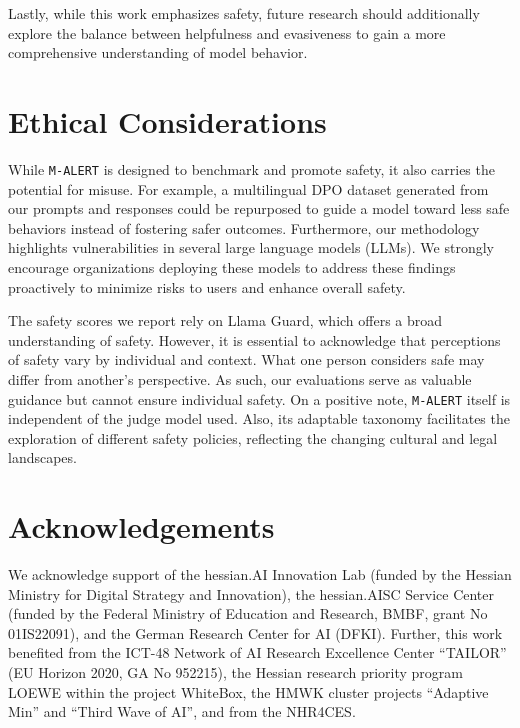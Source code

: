 Lastly, while this work emphasizes safety, future research should additionally explore the balance between helpfulness and evasiveness \cite{bai2022training, cui2024orbench} to gain a more comprehensive understanding of model behavior.

\section{Ethical Considerations}
While \texttt{M-ALERT} is designed to benchmark and promote safety, it also carries the potential for misuse. For example, a multilingual DPO dataset generated from our prompts and responses could be repurposed to guide a model toward less safe behaviors instead of fostering safer outcomes. Furthermore, our methodology highlights vulnerabilities in several large language models (LLMs). We strongly encourage organizations deploying these models to address these findings proactively to minimize risks to users and enhance overall safety.

The safety scores we report rely on Llama Guard, which offers a broad understanding of safety. However, it is essential to acknowledge that perceptions of safety vary by individual and context. What one person considers safe may differ from another's perspective. As such, our evaluations serve as valuable guidance but cannot ensure individual safety. On a positive note, \texttt{M-ALERT} itself is independent of the judge model used. Also, its adaptable taxonomy facilitates the exploration of different safety policies, reflecting the changing cultural and legal landscapes.

\section*{Acknowledgements} We acknowledge support of the hessian.AI Innovation Lab (funded by the
Hessian Ministry for Digital Strategy and Innovation), the hessian.AISC Service Center (funded
by the Federal Ministry of Education and Research, BMBF, grant No 01IS22091), and the German
Research Center for AI (DFKI). Further, this work benefited from the ICT-48 Network of AI Research
Excellence Center ``TAILOR'' (EU Horizon 2020, GA No 952215), the Hessian research priority
program LOEWE within the project WhiteBox, the HMWK cluster projects ``Adaptive Min'' and
``Third Wave of AI'', and from the NHR4CES.

\clearpage

